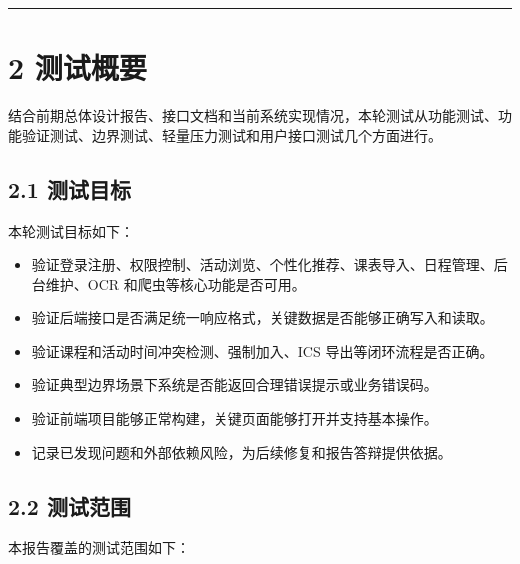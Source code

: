 \begin{center}\rule{0.5\linewidth}{0.5pt}\end{center}

\section{2 测试概要}\label{ux6d4bux8bd5ux6982ux8981}

结合前期总体设计报告、接口文档和当前系统实现情况，本轮测试从功能测试、功能验证测试、边界测试、轻量压力测试和用户接口测试几个方面进行。

\subsection{2.1 测试目标}\label{ux6d4bux8bd5ux76eeux6807}

本轮测试目标如下：

\begin{itemize}
\tightlist
\item
  验证登录注册、权限控制、活动浏览、个性化推荐、课表导入、日程管理、后台维护、OCR
  和爬虫等核心功能是否可用。
\item
  验证后端接口是否满足统一响应格式，关键数据是否能够正确写入和读取。
\item
  验证课程和活动时间冲突检测、强制加入、ICS 导出等闭环流程是否正确。
\item
  验证典型边界场景下系统是否能返回合理错误提示或业务错误码。
\item
  验证前端项目能够正常构建，关键页面能够打开并支持基本操作。
\item
  记录已发现问题和外部依赖风险，为后续修复和报告答辩提供依据。
\end{itemize}

\subsection{2.2 测试范围}\label{ux6d4bux8bd5ux8303ux56f4}

本报告覆盖的测试范围如下：

